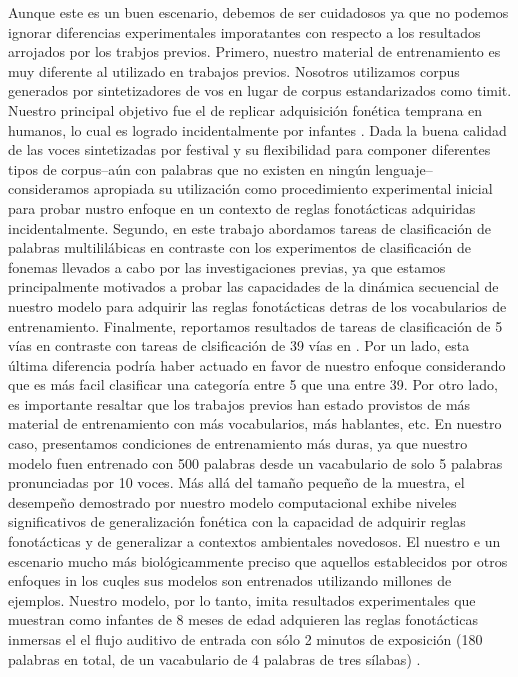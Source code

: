 {Aunque este es un buen escenario, debemos de ser cuidadosos ya que no podemos ignorar diferencias experimentales imporatantes con respecto a los resultados arrojados por los trabjos previos. Primero, nuestro material de entrenamiento es muy diferente  al utilizado en trabajos previos. Nosotros utilizamos corpus generados por sintetizadores de vos en lugar de corpus estandarizados como \gls{timit}.
Nuestro principal objetivo fue el de replicar adquisición fonética temprana en humanos, lo cual es logrado incidentalmente por infantes \cite{Saffran1996StatisticalLB}.
Dada la buena calidad de las voces sintetizadas por \gls{festival}  \cite{festival2014} y su flexibilidad para componer diferentes tipos de corpus--aún con palabras que no existen en ningún lenguaje--consideramos apropiada su utilización como procedimiento experimental inicial para probar nustro enfoque en un contexto de reglas fonotácticas adquiridas incidentalmente.
Segundo, en este trabajo abordamos tareas de clasificación de palabras multililábicas en contraste con los experimentos de clasificación de fonemas llevados a cabo por las investigaciones previas, ya que estamos principalmente motivados a probar las capacidades de la dinámica secuencial de nuestro modelo para adquirir las reglas fonotácticas detras de los vocabularios de entrenamiento.
Finalmente, reportamos resultados de tareas de clasificación de 5 vías en contraste con tareas de clsificación de 39 vías en \cite{Lee:2009:UFL:2984093.2984217}.
Por un lado, esta última diferencia podría haber actuado en favor de nuestro enfoque considerando que es más facil clasificar una categoría entre 5 que una entre 39.
Por otro lado, es importante resaltar que los trabajos previos han estado provistos de más material de entrenamiento con más vocabularios, más hablantes, etc.
En nuestro caso, presentamos condiciones de entrenamiento más duras, ya que nuestro modelo fuen entrenado con 500 palabras desde un vacabulario de solo 5 palabras pronunciadas por 10 voces.
Más allá del tamaño pequeño de la muestra, el desempeño demostrado por nuestro modelo computacional exhibe niveles significativos de generalización fonética con la capacidad de adquirir reglas fonotácticas y de generalizar a contextos ambientales novedosos. El nuestro e un escenario mucho más biológicammente preciso que aquellos establecidos por otros enfoques in los cuqles sus modelos son entrenados utilizando millones de ejemplos. Nuestro modelo, por lo tanto, imita resultados experimentales que muestran como infantes de 8 meses de edad adquieren las reglas fonotácticas inmersas el el flujo auditivo de entrada con sólo 2 minutos de exposición (180 palabras en total, de un vacabulario de 4 palabras de tres sílabas) \cite{Saffran1996StatisticalLB}.

}
